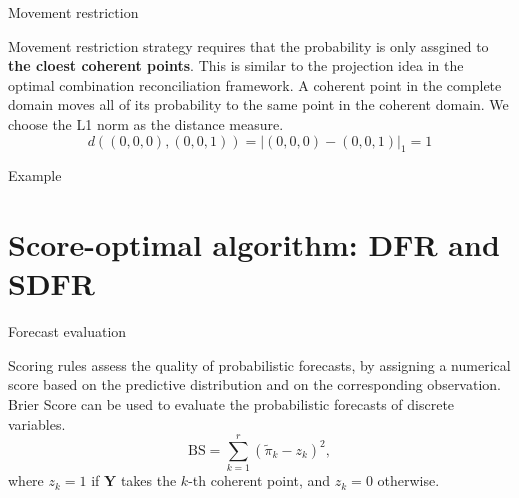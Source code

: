 \documentclass[12pt]{beamer}
\begin{document}
\begin{frame}{Movement restriction}

\begin{outline}
\0 Movement restriction strategy requires that the probability is only assgined to \textbf{the cloest coherent points}.
\1 This is similar to the projection idea in the optimal combination reconciliation framework.    
\1 A coherent point in the complete domain moves all of its probability to the same point in the coherent domain.
\1 We choose the L1 norm as the distance measure.
\[
    d((0, 0, 0), (0, 0, 1)) = |(0,0,0) - (0,0,1)|_1 = 1  
\]
\end{outline}
\vspace{-3mm}
\begin{block}{Example}\end{block}
\end{frame}

\section{Score-optimal algorithm: DFR and SDFR}

\begin{frame}{Forecast evaluation}

    \begin{outline}
        \1 Scoring rules assess the quality of probabilistic forecasts, by assigning a numerical score based on the predictive distribution and on the corresponding observation.
        \1 Brier Score can be used to evaluate the probabilistic forecasts of discrete variables.
        \[
          \text{BS} = \sum_{k=1}^r (\tilde{\pi}_k - {z}_k)^2,
        \]
        where $z_k = 1$ if $\mathbf{Y}$ takes the $k$-th coherent point, and $z_k = 0$ otherwise.
    \end{outline}
\end{frame}
\end{document}
